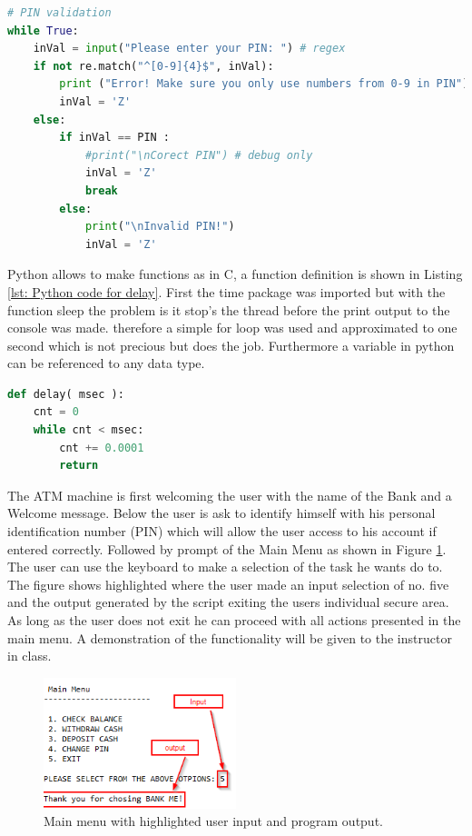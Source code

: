 \begin{lstlisting}[style=PythonStyle, language=Python, caption={Python code for input validation.},label=lst: Python code for input validation]
# PIN validation
while True:
	inVal = input("Please enter your PIN: ") # regex
	if not re.match("^[0-9]{4}$", inVal):
		print ("Error! Make sure you only use numbers from 0-9 in PIN")
		inVal = 'Z'             
	else:
		if inVal == PIN :    
			#print("\nCorect PIN") # debug only
			inVal = 'Z'  
			break             
		else:        
			print("\nInvalid PIN!")
			inVal = 'Z'  
\end{lstlisting}

Python allows to make functions as in C, a function definition is shown in Listing \ref{lst: Python code for delay}. First the time package was imported but with the function sleep the problem is it stop's the thread before the print output to the console was made. therefore a simple for loop was used and approximated to one second which is not precious but does the job. Furthermore a variable in python can be referenced to any data type.
\begin{lstlisting}[style=PythonStyle, language=Python, caption={Python code for delay.},label=lst: Python code for delay]
def delay( msec ):
	cnt = 0
	while cnt < msec:
		cnt += 0.0001
		return
\end{lstlisting}

The ATM machine is first welcoming the user with the name of the Bank and a Welcome message. Below the user is ask to identify himself with his personal identification number (PIN) which will allow the user access to his account if entered correctly. Followed by prompt of the Main Menu as shown in Figure \ref{fig: MainMenu}. The user can use the keyboard to make a selection of the task he wants do to. The figure shows highlighted where the user made an input selection of no. five and the output generated by the script exiting the users individual secure area. As long as the user does not exit he can proceed with all actions presented in the main menu. A demonstration of the functionality will be given to the instructor in class.
\begin{figure}[H]
	\centering
	\includegraphics[width=0.5\textwidth]{01_images/MainMenu.PNG}
	\caption{Main menu with highlighted user input and program output.}
	\label{fig: MainMenu}
\end{figure}


